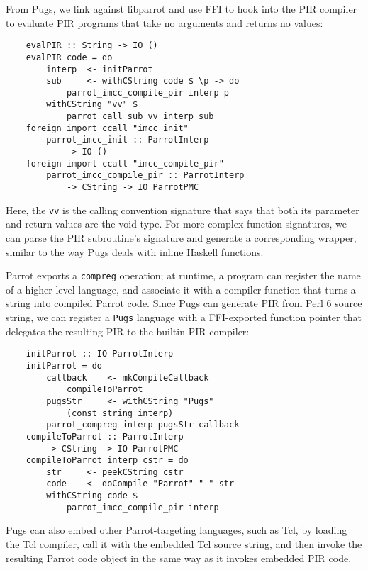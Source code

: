 \documentclass[]{sigplanconf}
\newcommand{\code}[1]{\texttt{#1}}
\begin{document}
From Pugs, we link against libparrot and use FFI to hook into the PIR compiler
to evaluate PIR programs that take no arguments and returns no values:

\begin{lstlisting}
    evalPIR :: String -> IO ()
    evalPIR code = do
        interp  <- initParrot
        sub     <- withCString code $ \p -> do
            parrot_imcc_compile_pir interp p
        withCString "vv" $
            parrot_call_sub_vv interp sub
    foreign import ccall "imcc_init"
        parrot_imcc_init :: ParrotInterp
            -> IO ()
    foreign import ccall "imcc_compile_pir"
        parrot_imcc_compile_pir :: ParrotInterp
            -> CString -> IO ParrotPMC
\end{lstlisting}

Here, the \code{vv} is the calling convention signature that says that both its
parameter and return values are the void type.  For more complex function
signatures, we can parse the PIR subroutine's signature and generate a
corresponding wrapper, similar to the way Pugs deals with inline Haskell
functions.

Parrot exports a \code{compreg} operation; at runtime, a program can register the
name of a higher-level language, and associate it with a compiler function that
turns a string into compiled Parrot code.  Since Pugs can generate PIR from
Perl 6 source string, we can register a \code{Pugs} language with a
FFI-exported function pointer that delegates the resulting PIR to the builtin
PIR compiler:

\begin{lstlisting}
    initParrot :: IO ParrotInterp
    initParrot = do
        callback    <- mkCompileCallback
            compileToParrot
        pugsStr     <- withCString "Pugs"
            (const_string interp)
        parrot_compreg interp pugsStr callback
    compileToParrot :: ParrotInterp
        -> CString -> IO ParrotPMC
    compileToParrot interp cstr = do
        str     <- peekCString cstr
        code    <- doCompile "Parrot" "-" str
        withCString code $
            parrot_imcc_compile_pir interp
\end{lstlisting}

Pugs can also embed other Parrot-targeting languages, such as Tcl, by loading
the Tcl compiler, call it with the embedded Tcl source string, and then invoke
the resulting Parrot code object in the same way as it invokes embedded PIR
code.

\end{document}
